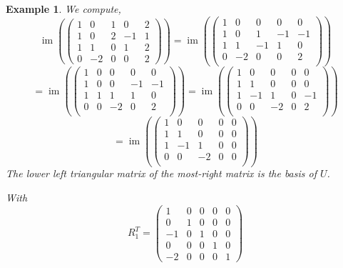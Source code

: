 \documentclass[a4paper,landscape,twocolumn]{article}
\newtheorem{ex}{Example}[section]
\DeclareMathOperator\image{im} %
\begin{document}
\begin{ex}
  We compute,
  \[
    \image\left(
      \begin{pmatrix}
        1 & 0 & 1 & 0 & 2 \\
        1 & 0 & 2 & -1 & 1 \\
        1 & 1 & 0 & 1 & 2 \\
        0 & -2 & 0 & 0 & 2
      \end{pmatrix}
    \right) = \image\left(
      \begin{pmatrix}
        1 & 0 & 0 & 0 & 0 \\
        1 & 0 & 1 & -1 & -1 \\
        1 & 1 & -1 & 1 & 0 \\
        0 & -2 & 0 & 0 & 2 \\
      \end{pmatrix}
    \right)
  \] \[
    = \image\left(
      \begin{pmatrix}
        1 & 0 & 0 & 0 & 0 \\
        1 & 0 & 0 & -1 & -1 \\
        1 & 1 & 1 & 1 & 0 \\
        0 & 0 & -2 & 0 & 2 \\
      \end{pmatrix}
    \right) = \image\left(
      \begin{pmatrix}
        1 & 0 & 0 & 0 & 0 \\
        1 & 1 & 0 & 0 & 0 \\
        1 & -1 & 1 & 0 & -1 \\
        0 & 0 & -2 & 0 & 2 \\
      \end{pmatrix}
    \right)
  \] \[
    = \image\left(
      \begin{pmatrix}
        1 & 0 & 0 & 0 & 0 \\
        1 & 1 & 0 & 0 & 0 \\
        1 & -1 & 1 & 0 & 0 \\
        0 & 0 & -2 & 0 & 0 \\
      \end{pmatrix}
    \right)
  \]
  The lower left triangular matrix of the most-right matrix
  is the basis of $U$.

  With
  \[
    R_1^T = \begin{pmatrix}
       1 & 0 & 0 & 0 & 0 \\
       0 & 1 & 0 & 0 & 0 \\
      -1 & 0 & 1 & 0 & 0 \\
       0 & 0 & 0 & 1 & 0 \\
      -2 & 0 & 0 & 0 & 1
    \end{pmatrix}
  \]
\end{ex}
\end{document}

